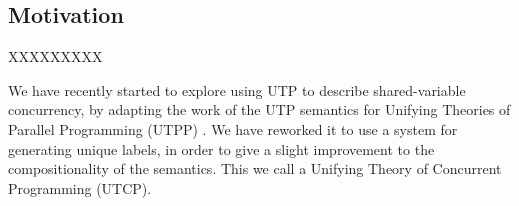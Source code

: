 \subsection{Motivation}\label{ssec:motivate}

\newpage
XXXXXXXXX

We have recently started to explore using UTP
to describe shared-variable concurrency,
by adapting the work of the  UTP semantics for Unifying Theories
of Parallel Programming (UTPP) \cite{DBLP:conf/icfem/WoodcockH02}.
We have reworked it to use a system for generating unique labels,
in order to give a slight improvement to the compositionality
of the semantics.
This we call a Unifying Theory of Concurrent Programming (UTCP)\cite{conf/tase/BMN16}.
